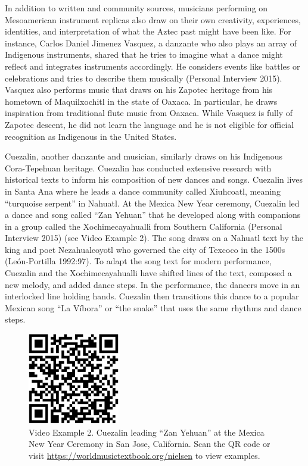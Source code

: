 \documentclass[twoside]{article}
\providecommand{\wmturl}{\href{https://worldmusictextbook.org/nielsen}{https://worldmusictextbook.org/nielsen}}
\providecommand{\wmturlcaption}{
  Scan the QR code or visit \wmturl{} to view examples.
}
\begin{document}
In addition to written and community sources, musicians performing on
Mesoamerican instrument replicas also draw on their own creativity,
experiences, identities, and interpretation of what the Aztec past might
have been like. For instance, Carlos Daniel Jimenez Vasquez, a danzante
who also plays an array of Indigenous instruments, shared that he tries
to imagine what a dance might reflect and integrates instruments
accordingly. He considers events like battles or celebrations and tries
to describe them musically (Personal Interview 2015). Vasquez also
performs music that draws on his Zapotec heritage from his hometown of
Maquilxochitl in the state of Oaxaca. In particular, he draws
inspiration from traditional flute music from Oaxaca. While Vasquez is
fully of Zapotec descent, he did not learn the language and he is not
eligible for official recognition as Indigenous in the United States.

Cuezalin, another danzante and musician, similarly draws on his
Indigenous Cora-Tepehuan heritage. Cuezalin has conducted extensive
research with historical texts to inform his composition of new dances
and songs. Cuezalin lives in Santa Ana where he leads a dance community
called Xiuhcoatl, meaning ``turquoise serpent'' in Nahuatl. At the
Mexica New Year ceremony, Cuezalin led a dance and song called ``Zan
Yehuan'' that he developed along with companions in a group called the
Xochimecayahualli from Southern California (Personal Interview 2015)
(see Video Example 2). The song draws on a Nahuatl text by the king and
poet Nezahualcoyotl who governed the city of Texcoco in the 1500s
(León-Portilla 1992:97). To adapt the song text for modern performance,
Cuezalin and the Xochimecayahualli have shifted lines of the text,
composed a new melody, and added dance steps. In the performance, the
dancers move in an interlocked line holding hands. Cuezalin then
transitions this dance to a popular Mexican song ``La Víbora'' or ``the
snake'' that uses the same rhythms and dance steps.

\begin{figure}
  \centering
  \includegraphics[height=4cm]{nielsen-video-2.png}
  \caption*{Video Example 2. Cuezalin leading ``Zan Yehuan'' at the Mexica New
  Year Ceremony in San Jose, California. \wmturlcaption}
\end{figure}
\end{document}
